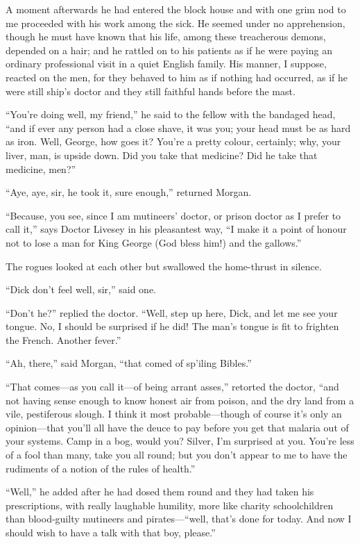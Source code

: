 A moment afterwards he had entered the block house and with one grim nod to me proceeded with his work among the sick. He seemed under no apprehension, though he must have known that his life, among these treacherous demons, depended on a hair; and he rattled on to his patients as if he were paying an ordinary professional visit in a quiet English family. His manner, I suppose, reacted on the men, for they behaved to him as if nothing had occurred, as if he were still ship’s doctor and they still faithful hands before the mast.

\enquote{You’re doing well, my friend,} he said to the fellow with the bandaged head, \enquote{and if ever any person had a close shave, it was you; your head must be as hard as iron. Well, George, how goes it? You’re a pretty colour, certainly; why, your liver, man, is upside down. Did you take that medicine? Did he take that medicine, men?}

\enquote{Aye, aye, sir, he took it, sure enough,} returned Morgan.

\enquote{Because, you see, since I am mutineers’ doctor, or prison doctor as I prefer to call it,} says Doctor Livesey in his pleasantest way, \enquote{I make it a point of honour not to lose a man for King George (God bless him!) and the gallows.}

The rogues looked at each other but swallowed the home-thrust in silence.

\enquote{Dick don’t feel well, sir,} said one.

\enquote{Don’t he?} replied the doctor. \enquote{Well, step up here, Dick, and let me see your tongue. No, I should be surprised if he did! The man’s tongue is fit to frighten the French. Another fever.}

\enquote{Ah, there,} said Morgan, \enquote{that comed of sp’iling Bibles.}

\enquote{That comes---as you call it---of being arrant asses,} retorted the doctor, \enquote{and not having sense enough to know honest air from poison, and the dry land from a vile, pestiferous slough. I think it most probable---though of course it’s only an opinion---that you’ll all have the deuce to pay before you get that malaria out of your systems. Camp in a bog, would you? Silver, I’m surprised at you. You’re less of a fool than many, take you all round; but you don’t appear to me to have the rudiments of a notion of the rules of health.}

\enquote{Well,} he added after he had dosed them round and they had taken his prescriptions, with really laughable humility, more like charity schoolchildren than blood-guilty mutineers and pirates---\enquote{well, that’s done for today. And now I should wish to have a talk with that boy, please.}

